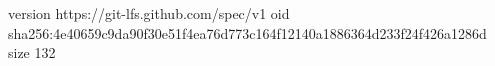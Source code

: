version https://git-lfs.github.com/spec/v1
oid sha256:4e40659c9da90f30e51f4ea76d773c164f12140a1886364d233f24f426a1286d
size 132
